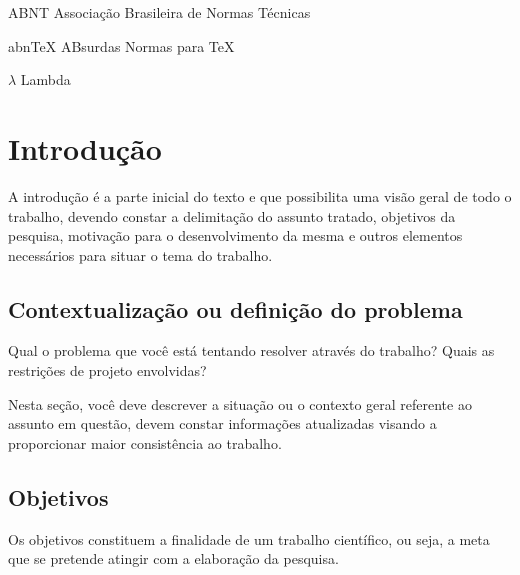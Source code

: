 \documentclass[
	12pt,			%
	openright,		%
	oneside,	
	a4paper,		%
	english,		%
	brazil			%
]{abntex2/abntex2}  %
\begin{document}
\listoffigures*
\cleardoublepage

\listoftables*
\cleardoublepage

\begin{siglas}
  \item[ABNT] Associação Brasileira de Normas Técnicas
  \item[abnTeX] ABsurdas Normas para TeX
\end{siglas}

\begin{simbolos}
  \item[$ \lambda $] Lambda
\end{simbolos}

\tableofcontents*
\cleardoublepage

\textual

\chapter{Introdução}

	A introdução é a parte inicial do texto e que possibilita uma visão geral de
todo o trabalho, devendo constar a delimitação do assunto tratado, objetivos
da pesquisa, motivação para o desenvolvimento da mesma e outros
elementos necessários para situar o tema do trabalho.

	\section{Contextualização ou definição do problema}
	
		Qual o problema que você está tentando resolver através do trabalho? Quais
		as restrições de projeto envolvidas?

		Nesta seção, você deve descrever a situação ou o contexto geral referente ao
		assunto em questão, devem constar informações atualizadas visando a
		proporcionar maior consistência ao trabalho.

	\section{Objetivos}

		Os objetivos constituem a finalidade de um trabalho científico, ou seja, a
		meta que se pretende atingir com a elaboração da pesquisa.
		
\end{document}
